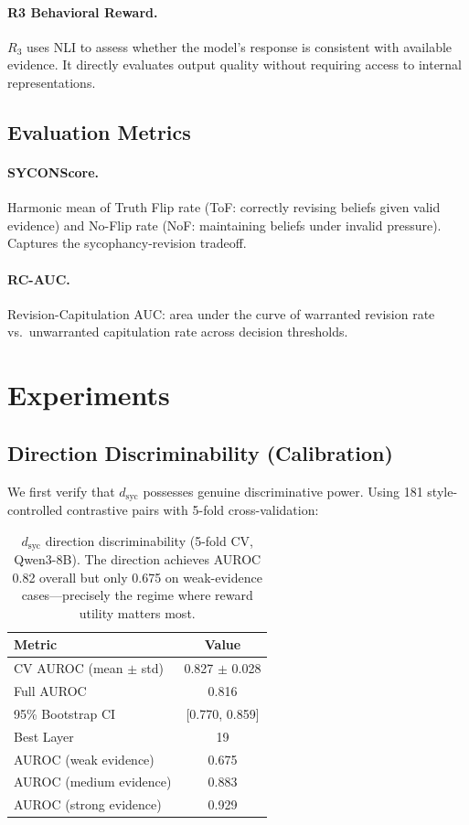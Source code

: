 \documentclass[11pt,a4paper]{article}
\begin{document}
\paragraph{R3 Behavioral Reward.} $R_3$ uses NLI to assess whether the model's response is consistent with available evidence. It directly evaluates output quality without requiring access to internal representations.

\subsection{Evaluation Metrics}

\paragraph{SYCONScore.} Harmonic mean of Truth Flip rate (ToF: correctly revising beliefs given valid evidence) and No-Flip rate (NoF: maintaining beliefs under invalid pressure). Captures the sycophancy-revision tradeoff.

\paragraph{RC-AUC.} Revision-Capitulation AUC: area under the curve of warranted revision rate vs.\ unwarranted capitulation rate across decision thresholds.

\section{Experiments}

\subsection{Direction Discriminability (Calibration)}

We first verify that $d_\text{syc}$ possesses genuine discriminative power. Using 181 style-controlled contrastive pairs with 5-fold cross-validation:

\begin{table}[h]
\centering
\small
\begin{tabular}{lc}
\toprule
\textbf{Metric} & \textbf{Value} \\
\midrule
CV AUROC (mean $\pm$ std) & 0.827 $\pm$ 0.028 \\
Full AUROC & 0.816 \\
95\% Bootstrap CI & [0.770, 0.859] \\
Best Layer & 19 \\
\midrule
AUROC (weak evidence) & 0.675 \\
AUROC (medium evidence) & 0.883 \\
AUROC (strong evidence) & 0.929 \\
\bottomrule
\end{tabular}
\caption{$d_\text{syc}$ direction discriminability (5-fold CV, Qwen3-8B). The direction achieves AUROC 0.82 overall but only 0.675 on weak-evidence cases---precisely the regime where reward utility matters most.}
\label{tab:discriminability}
\end{table}
\end{document}
